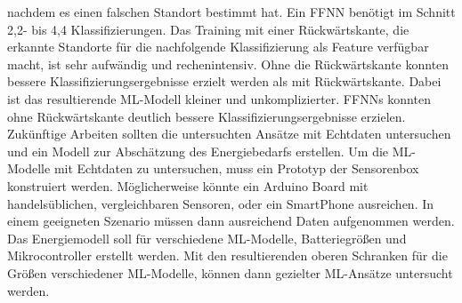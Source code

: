 nachdem es einen falschen Standort bestimmt hat.
Ein FFNN benötigt im Schnitt 2,2- bis 4,4 Klassifizierungen.
\newline
\newline
Das Training mit einer Rückwärtskante, die erkannte Standorte für die nachfolgende Klassifizierung als Feature verfügbar macht, ist sehr aufwändig und rechenintensiv.
Ohne die Rückwärtskante konnten bessere Klassifizierungsergebnisse erzielt werden als mit Rückwärtskante.
Dabei ist das resultierende ML-Modell kleiner und unkomplizierter.
FFNNs konnten ohne Rückwärtskante deutlich bessere Klassifizierungsergebnisse erzielen.
\newline
\newline
Zukünftige Arbeiten sollten die untersuchten Ansätze mit Echtdaten untersuchen und ein Modell zur Abschätzung des Energiebedarfs erstellen.
Um die ML-Modelle mit Echtdaten zu untersuchen, muss ein Prototyp der Sensorenbox konstruiert werden.
Möglicherweise könnte ein Arduino Board mit handelsüblichen, vergleichbaren Sensoren, oder ein SmartPhone ausreichen.
In einem geeigneten Szenario müssen dann ausreichend Daten aufgenommen werden.
\newline
\newline
Das Energiemodell soll für verschiedene ML-Modelle, Batteriegrößen und Mikrocontroller erstellt werden.
Mit den resultierenden oberen Schranken für die Größen verschiedener ML-Modelle,
können dann gezielter ML-Ansätze untersucht werden.